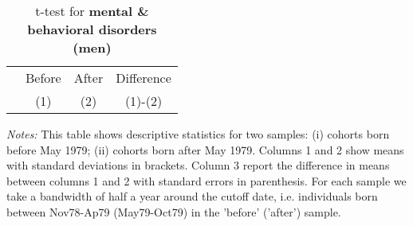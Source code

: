 \begin{table}[H] \centering 
	\begin{threeparttable} \centering \caption{t-test for \textbf{mental \& behavioral disorders (men)}}\label{tab:t-test_d5male}
		\begin{footnotesize}
			{\def\sym#1{\ifmmode^{#1}\else\(^{#1}\)\fi} 
				\begin{tabular}{l*{3}{c}}
					\toprule 
					& \multicolumn{1}{c}{Before} & \multicolumn{1}{c}{After} & \multicolumn{1}{c}{Difference} \\
					&\multicolumn{1}{c}{(1)}&\multicolumn{1}{c}{(2)}&\multicolumn{1}{c}{(1)-(2)}\\
					\midrule
					
					\bottomrule
			\end{tabular}}
		\end{footnotesize}
	\end{threeparttable} 
	\begin{minipage}{0.9\linewidth}
		\scriptsize \emph{Notes:} This table shows descriptive statistics for two samples: (i) cohorts born before May 1979; (ii) cohorts born after May 1979. Columns 1 and 2 show means with standard deviations in brackets. Column 3 report the difference in means between columns 1 and 2 with standard errors in parenthesis. For each sample we take a bandwidth of half a year around the cutoff date, i.e. individuals born between Nov78-Ap79 (May79-Oct79) in the 'before' ('after') sample.
	\end{minipage}
\end{table} 